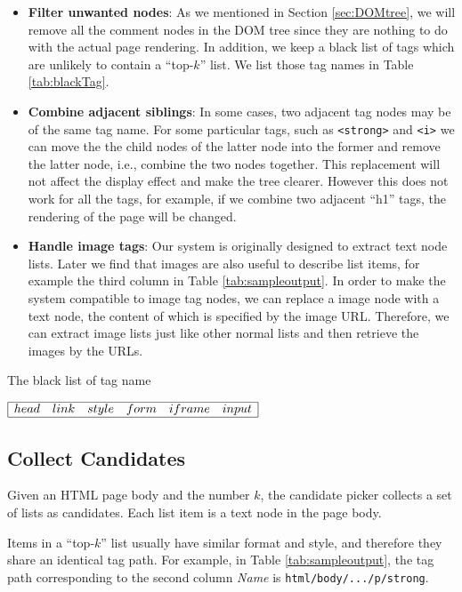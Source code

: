 \begin{itemize}
  \item \textbf{Filter unwanted nodes}:
  As we mentioned in Section \ref{sec:DOMtree}, we will remove all the comment nodes in the DOM tree since they are nothing to do with the actual page rendering. In addition, we keep a black list of tags which are unlikely to contain a ``top-$k$'' list. We list those tag names in Table \ref{tab:blackTag}.
  \item \textbf{Combine adjacent siblings}:
  In some cases, two adjacent tag nodes may be of the same tag name. For some particular tags, such as {\tt <strong>} and {\tt <i>} we can move the the child nodes of the latter node into the former and remove the latter node, i.e., combine the two nodes together. This replacement will not affect the display effect and make the tree clearer. However this does not work for all the tags, for example, if we combine two adjacent ``h1'' tags, the rendering of the page will be changed.
  \item \textbf{Handle image tags}:
  Our system is originally designed to extract text node lists.
  Later we find that images are also useful to describe list items, for example the third column in Table \ref{tab:sampleoutput}.
  In order to make the system compatible to image tag nodes, we can replace a image node with a text node, the content of which is specified by the image URL. Therefore, we can extract image lists just like other normal lists and then retrieve the images by the URLs.
\end{itemize}

\begin{table}
\centering
\caption{The black list of tag name}
$
\begin{array}{|cccccc|}
\hline
  head & link & style & form & iframe & input \\
\hline
\end{array}
$

\label{tab:blackTag}
\end{table}


\subsection{Collect Candidates}
\label{sec:picker}
Given an HTML page body and the number $k$,
the candidate picker collects a set of lists as candidates.
Each list item is a text node in the page body.

Items in a ``top-$k$'' list usually have similar format and style,
and therefore they share an identical tag path.
For example, in Table \ref{tab:sampleoutput},
the tag path corresponding to the second column {\em Name} is
{\tt html/body/.../p/strong}.

